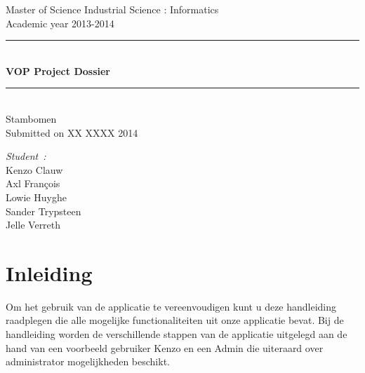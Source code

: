 \documentclass[pdftex,a4paper,12pt,twoside]{report}
\newcommand{\HRule}{\rule{\linewidth}{0.5mm}}
\newcommand{\emptypage}
{
	\newpage
	\thispagestyle{empty}
	\mbox{}
	\newpage
}
\newcommand{\studenta}{Kenzo Clauw}
\newcommand{\studentb}{Axl Fran\c{c}ois}
\newcommand{\studentc}{Lowie Huyghe}
\newcommand{\studentd}{Sander Trypsteen}
\newcommand{\studente}{Jelle Verreth}
\newcommand{\titel}{VOP Project Dossier}
\newcommand{\ondertitel}{ Stambomen}
\newcommand{\datum}{XX XXXX 2014}
\newcommand{\academiejaar}{2013-2014}
\begin{document}

\emptypage


\begin{titlepage}
\begin{center}
Master of Science Industrial Science : Informatics\\
Academic year \academiejaar

\vfill

\HRule \\[0.4cm]
{ \huge \bfseries \titel}\\[0.4cm]
\HRule \\[0.4cm]

{\Large \ondertitel}\\[0.4cm]

Submitted on \datum

\vfill

\begin{minipage}{0.49\textwidth}
\begin{flushleft}
\emph{Student\ifdefined\ \fi :}\\
\studenta \\
\studentb \\
\studentc \\
\studentd \\
\studente
\end{flushleft}
\end{minipage}
\begin{minipage}{0.49\textwidth}
\begin{flushright}
\end{flushright}
\end{minipage}

\end{center}

\end{titlepage}

\abstract


\tableofcontents
\chapter{Inleiding}\label{ch:preface}
Om het gebruik van de applicatie te vereenvoudigen kunt u deze handleiding raadplegen die alle mogelijke functionaliteiten uit onze applicatie bevat.
Bij de handleiding worden de verschillende stappen van de applicatie uitgelegd aan de hand van een voorbeeld gebruiker Kenzo en een Admin die uiteraard over administrator mogelijkheden beschikt.
\end{document}
